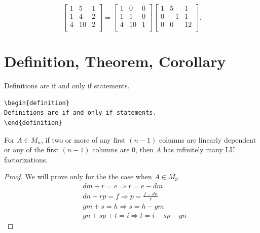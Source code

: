 \[
\begin{bmatrix}
1 & 5 & 1\\
1 & 4 & 2\\
4 & 10 & 2\\
\end{bmatrix}
=
\begin{bmatrix}
1 & 0 & 0\\
1 & 1 & 0\\
4 & 10 & 1\\
\end{bmatrix}
\begin{bmatrix}
1 & 5 & 1\\
0 & -1 & 1\\
0 & 0 & 12\\
\end{bmatrix}.
\]



\section{Definition, Theorem, Corollary}


\begin{definition}
Definitions are if and only if statements.  
\end{definition}

\begin{verbatim}
\begin{definition}
Definitions are if and only if statements.  
\end{definition}
\end{verbatim}

\begin{theorem}
{For $A \in M_n$, if two or more of any first $(n-1)$ columns are linearly dependent or any of the first $(n-1)$ columns are 0, then $A$ has infinitely many LU factorizations.}
\end{theorem}

\begin{proof} We will prove only for the the case when $A \in M_3$. \\
 \begin{align} 
&dm + r = e  \Rightarrow r = e-dm \label{eqn:1}\\
&dn + rp = f \Rightarrow p=\frac{f-dn}{r} \label{eqn:2}\\
&gm + s = h \Rightarrow s = h - gm \label{eqn:3}\\
&gn + sp + t = i \Rightarrow t  = i-sp-gn \label{eqn:4}
\end{align}
 
\end{proof} %
 

